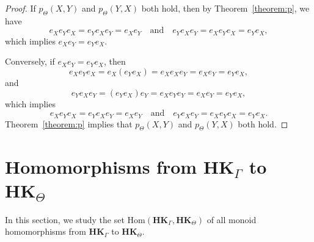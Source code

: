 \documentclass[pdflatex,sn-mathphys-num]{sn-jnl}
\newcommand{\hk}{\mathbf{HK}_{\Theta}}
\newcommand{\hkg}{\mathbf{HK}_{\Gamma}}
\theoremstyle{definition}
\theoremstyle{remark}
\begin{document}
\begin{proof}
   If $p_{\Theta}(X, Y)$ and $p_{\Theta}(Y, X)$ both hold, then by Theorem~\ref{theorem:p}, we have 
   \[
   e_X e_Y e_X = e_Y e_X e_Y = e_X e_Y \quad \text{and} \quad e_Y e_X e_Y = e_X e_Y e_X = e_Y e_X,
   \]
   which implies $e_X e_Y = e_Y e_X$.

   Conversely, if $e_X e_Y = e_Y e_X$, then 
   \[
   e_X e_Y e_X = e_X (e_Y e_X) = e_X e_X e_Y = e_X e_Y = e_Y e_X,
   \]
   and
   \[
   e_Y e_X e_Y = (e_Y e_X) e_Y = e_X e_Y e_Y = e_X e_Y = e_Y e_X,
   \]
   which implies 
   \[
   e_X e_Y e_X = e_Y e_X e_Y = e_X e_Y \quad \text{and} \quad e_Y e_X e_Y = e_X e_Y e_X = e_Y e_X.
   \]
   Theorem~\ref{theorem:p} implies that $p_{\Theta}(X, Y)$ and $p_{\Theta}(Y, X)$ both hold.
\end{proof}




























































\section{Homomorphisms from $\hkg$ to $\hk$}\label{HOM}

In this section, we study the set $\mathrm{Hom}(\hkg, \hk)$ of all monoid homomorphisms from $\hkg$ to $\hk$.
\end{document}

